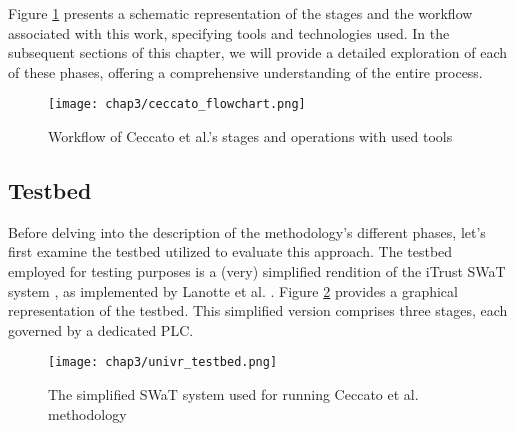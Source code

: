 Figure \ref{fig:3_ceccato_overview} presents a schematic representation of the stages and the workflow associated with this work, specifying tools and technologies used. In the subsequent sections of this chapter, we will provide a detailed exploration of each of these phases, offering a comprehensive understanding of the entire process. 

\begin{figure}[ht]
	\centering
	\texttt{[image: chap3/ceccato\_flowchart.png]}
	\caption{Workflow of Ceccato et al.'s stages and operations with used tools}
	\label{fig:3_ceccato_overview}
\end{figure}

\subsection{Testbed}
\label{subsec:3_testbed}
Before delving into the description of the methodology's different phases, let's first examine the testbed utilized to evaluate this approach. The testbed employed for testing purposes is a (very) simplified rendition of the iTrust SWaT system \cite{swat_home}, as implemented by Lanotte et al. \cite{lanotte_et_al}. Figure \ref{fig:univr_testbed} provides a graphical representation of the testbed. This simplified version comprises three stages, each governed by a dedicated PLC.

\begin{figure}[ht]
	\centering
	\texttt{[image: chap3/univr\_testbed.png]}
	\caption{The simplified SWaT system used for running Ceccato et al. methodology}
	\label{fig:univr_testbed}
\end{figure}

